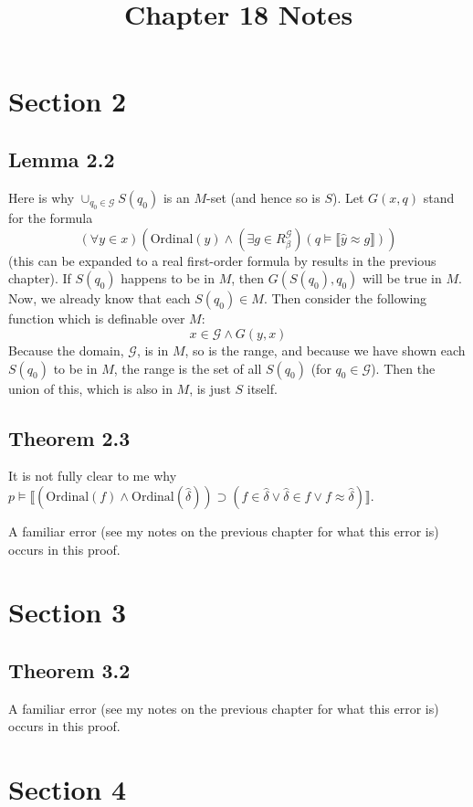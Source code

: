 \documentclass{article}
\title{Chapter 18 Notes}
\newcommand{\lbc}{\llbracket}
\newcommand{\rbc}{\rrbracket}
\theoremstyle{definition}
\begin{document}
\date{}
\maketitle

\section*{Section 2}

\subsection*{Lemma 2.2}
Here is why $\cup_{q_0\in\mathcal{G}}S(q_0)$ is an $M$-set (and hence so is $S$). Let 
$G(x,q)$ stand for the formula
\[ (\forall y\in x)(\textrm{Ordinal}(y)\wedge(\exists g\in R^\mathcal{G}_\beta)(q\vDash\lbc\hat{y}\approx g\rbc)) \]
(this can be expanded to a real first-order formula by results in the previous chapter).
If $S(q_0)$ happens to be in $M$, then $G(S(q_0),q_0)$ will be true in $M$. Now, we already know that each 
$S(q_0)\in M$. Then consider the following function which is definable over $M$:
\[ x\in\mathcal{G}\wedge G(y,x) \]
Because the domain, $\mathcal{G}$, is in $M$, so is the range, and because we have shown each $S(q_0)$ to be in $M$, the 
range is the set of all $S(q_0)$ (for $q_0\in\mathcal{G}$). Then the union of this, which is also in $M$, 
is just $S$ itself.

\subsection*{Theorem 2.3}
It is not fully clear to me why 
$p\vDash\lbc(\textrm{Ordinal}(f)\wedge\textrm{Ordinal}(\hat{\delta}))\supset (f\in\hat{\delta}\vee\hat{\delta}\in f\vee f\approx\hat{\delta})\rbc$.

A familiar error (see my notes on the previous chapter for what this error is) occurs in this proof.

\section*{Section 3}

\subsection*{Theorem 3.2}
A familiar error (see my notes on the previous chapter for what this error is) occurs in this proof.

\section*{Section 4}
\end{document}
